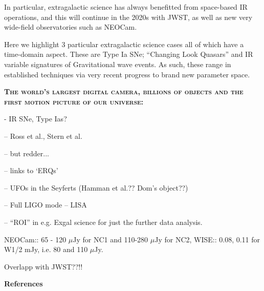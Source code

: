 \documentclass[12pt]{article}
\begin{document}
\smallskip
\smallskip
\noindent
In particular, extragalactic science has always benefitted from space-based IR operations, and this will continue in the 2020s with JWST, as well as new very wide-field observatories such as NEOCam. 

Here we highlight 3 particular extragalactic science cases all of which have a time-domain aspect. These are Type Ia SNe; ``Changing Look Quasars'' and IR variable signatures of Gravitational wave events. As such, these range in established techniques via very recent progress to brand new parameter space. 

\smallskip
\smallskip
\noindent
\textbf{\textsc{The world's largest digital camera, billions of objects and  the first motion picture of our universe: }} 

- IR SNe, Type Ias?

\smallskip
\smallskip
\noindent
-- Ross et al., Stern et al. 

\smallskip
\smallskip
\noindent
-- but redder...

\smallskip
\smallskip
\noindent
-- links to `ERQs'

\smallskip
\smallskip
\noindent
-- UFOs in the Seyferts (Hamman et al.?? Dom's object??)

\smallskip
\smallskip
\noindent
-- Full LIGO mode
-- LISA


\smallskip
\smallskip
\noindent
-- ``ROI'' in e.g. Exgal science for just the further data analysis. 

\smallskip
\smallskip
\noindent
NEOCam:: 65 -  120 $\mu$Jy for NC1 and 110-280 $\mu$Jy for NC2, 
WISE:: 0.08, 0.11 for W1/2 mJy, i.e. 80 and 110 $\mu$Jy.

\smallskip
\smallskip
\noindent
Overlapp with JWST??!!

\pagebreak
\textbf{References}
\end{document}
